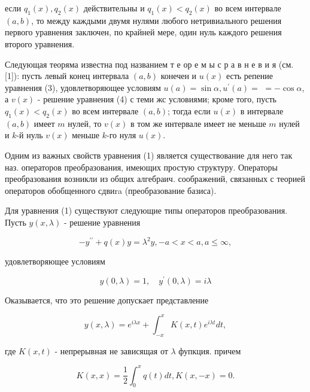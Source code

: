 \documentclass[10pt]{article}
\begin{document}
если $q_{1}(x), q_{2}(x)$ действительны и $q_{1}(x)<q_{2}(x)$ во всем интервале $(a, b)$, то между каждыми двумя нулями любого нетривиального решения первого уравнения заключен, по крайней мере, один нуль каждого решения второго уравнения.



Следующая теоряма известна под названием т е ор е м ы с р а в н е в и я (см. [1]): пусть левый конец интервала $(a, b)$ конечен и $u(x)$ есть репение уравнения (3), удовлетворяющее условиям $u(a)=\sin \alpha, u^{\prime}(a)=$ $=-\cos \alpha$, а $v(x)$ - решение уравнения (4) с теми жс условиями; кроме того, пусть $q_{1}(x)<q_{2}(x)$ во всем интервале $(a, b)$; тогда если $u(x)$ в интервале $(a, b)$ имеет $m$ нулей, то $v(x)$ в том же интервале имеет не меньше $m$ нулей и $k$-й нуль $v(x)$ меньше $k$-го нуля $u(x)$.



Одним из важных свойств уравнения (1) является существование для него так наз. операторов преобразования, имеющих простую структуру. Операторы преобразования возникли из общих алгебраич. соображений, связанных с теорией операторов обобщенного сдвиra (преобразование базиса).



Для уравнения (1) существуют следующие типы операторов преобразования. Пусть $y(x, \lambda)$ - решение уравнения



\[

-y^{\prime \prime}+q(x) y=\lambda^{2} y,-a<x<a, a \leqslant \infty,

\]



удовлетворяющее условиям



\[

y(0, \lambda)=1, \quad y^{\prime}(0, \lambda)=i \lambda

\]



Оказывается, что это решение допускает представление



\[

y(x, \lambda)=e^{i \lambda x}+\int_{-x}^{x} K(x, t) e^{i \lambda t} d t,

\]



где $K(x, t)$ - непрерывная не зависящая от $\lambda$ фупкция. причем



\[

K(x, x)=\frac{1}{2} \int_{0}^{x} q(t) d t, K(x,-x)=0 .

\]
\end{document}

